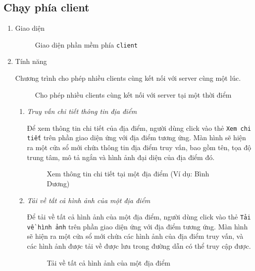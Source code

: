 \subsection{Chạy phía client}
\bf
\begin{enumerate}
\large\item Giao diện
\normalsize
\begin{figure}[H]
\caption{Giao diện phần mềm phía \texttt{client}}
\end{figure}

\large\item Tính năng

\rm
Chương trình cho phép nhiều clients cùng kết nối với server cùng một lúc.

\begin{figure}[H]
\caption{Cho phép nhiều clients cùng kết nối với server tại một thời điểm}
\end{figure}

\normalsize\bf
\begin{enumerate}
\item \textit{Truy vấn chi tiết thông tin địa điểm}
\rm

Để xem thông tin chi tiết của địa điểm, người dùng click vào thẻ \texttt{Xem chi tiết} trên phần giao diện ứng với địa điểm tương ứng. Màn hình sẽ hiện ra một cửa sổ mới chứa thông tin địa điểm truy vấn, bao gồm tên, tọa độ trung tâm, mô tả ngắn và hình ảnh đại diện của địa điểm đó.

\begin{figure}[H]
\end{figure}
\begin{figure}[H]
\caption{Xem thông tin chi tiết tại một địa điểm (Ví dụ: Bình Dương)}
\end{figure}

\bf
\item \textit{Tải về tất cả hình ảnh của một địa điểm}
\rm

Để tải về tất cả hình ảnh của một địa điểm, người dùng click vào thẻ \texttt{Tải về hình ảnh} trên phần giao diện ứng với địa điểm tương ứng. Màn hình sẽ hiện ra một cửa sổ mới chứa các hình ảnh của địa điểm truy vấn, và các hình ảnh được tải về được lưu trong đường dẫn có thể truy cập được.

\begin{figure}[H]
\end{figure}
\begin{figure}[H]
\caption{Tải về tất cả hình ảnh của một địa điểm}
\end{figure}


\end{enumerate}
\end{enumerate}
